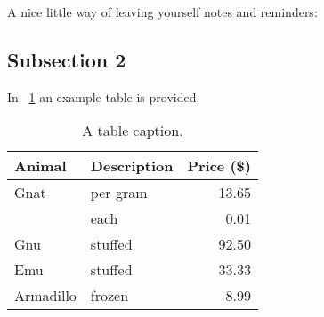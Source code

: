 A nice little way of leaving yourself notes and reminders:



\subsection{Subsection 2}
\label{sec:Subsection2}

In \tablename~\ref{tbl:aTable} an example table is provided. 

\begin{table}[htb]
\centering
\caption{A table caption.}
\label{tbl:aTable}
\vspace{.5em}
\begin{tabular}{|llr|}
	\hline
	\textbf{Animal} & \textbf{Description} & \textbf{Price (\$)} \\ \hline
	Gnat            & per gram             &               13.65 \\ \hline
	                & each                 &                0.01 \\ \hline
	Gnu             & stuffed              &               92.50 \\ \hline
	Emu             & stuffed              &               33.33 \\ \hline
	Armadillo       & frozen               &                8.99 \\ \hline
\end{tabular}
\end{table}

